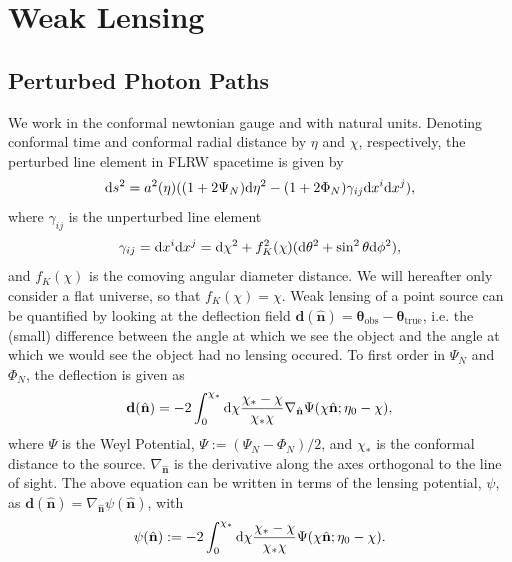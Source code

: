 \documentclass[11pt]{article} %
\DeclareRobustCommand{\d}{\ifmmode\text{d}\else d\fi}
\begin{document}
\printbibliography

\appendix

\section{Weak Lensing}\label{sec:weaklensing}
\subsection{Perturbed Photon Paths}
We work in the conformal newtonian gauge and with natural units. Denoting conformal time and conformal radial distance by $\eta$ and $\chi$, respectively, the perturbed line element in FLRW spacetime is given by
\begin{equation}
    \d s^2 = a^2(\eta)((1 + 2\Psi_N) \d \eta^2 - (1 + 2\Phi_N) \gamma_{ij}\d x^i \d x^j),
\end{equation}
where $\gamma_{ij}$ is the unperturbed line element
\begin{equation}
    \gamma_{ij} = \d x^i \d x^j = \d \chi^2 + f^2_K(\chi)(\d \theta^2 + \sin ^2 \theta \d \phi ^2),
\end{equation}
and $f_K(\chi)$ is the comoving angular diameter distance. We will hereafter only consider a flat universe, so that $f_K(\chi) = \chi$. Weak lensing of a point source can be quantified by looking at the deflection field $\mathbf d (\hat{\mathbf n}) = \mathbf \theta_{\text{obs}} - \mathbf \theta_{\text{true}}$, i.e. the (small) difference between the angle at which we see the object and the angle at which we would see the object had no lensing occured. To first order in $\Psi_N$ and $\Phi_N$, the deflection is given as \cite{dodelson2020modern}
\begin{equation}
    \mathbf d(\hat{\mathbf n}) = -2 \int_0^{\chi_*}\d \chi \frac{\chi_* - \chi}{\chi_*\chi}\nabla_{\hat{\mathbf n}}\Psi(\chi\hat{\mathbf n};\eta_0 - \chi),
\end{equation}
where $\Psi$ is the Weyl Potential, $\Psi := (\Psi_N - \Phi_N)/2$, and $\chi_*$ is the conformal distance to the source. $\nabla_{\hat{\mathbf n}}$ is the derivative along the axes orthogonal to the line of sight. The above equation can be written in terms of the lensing potential, $\psi$, as $\mathbf d (\hat{\mathbf n}) = \nabla_{\hat{\mathbf n}} \psi(\hat{\mathbf n})$, with
\begin{equation}
    \psi(\hat {\mathbf n}) := -2 \int_0^{\chi_*}\d \chi \frac{\chi_* - \chi}{\chi_*\chi}\Psi(\chi\hat{\mathbf n};\eta_0 - \chi).
\end{equation}
\end{document}
